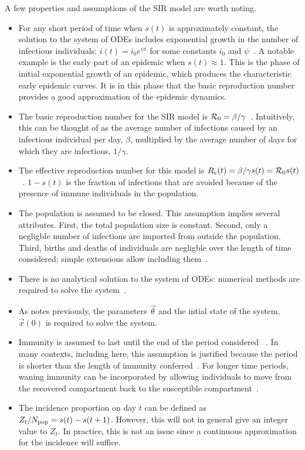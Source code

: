 \documentclass[thesis.tex]{subfiles}
\begin{document}
A few properties and assumptions of the SIR model are worth noting.
\begin{itemize}
    \item For any short period of time when $s(t)$ is approximately constant, the solution to the system of ODEs includes exponential growth in the number of infectious individuals: $i(t) = i_0 e^{\psi t}$ for some constants $i_0$ and $\psi$~\autocite[section 1.2]{diekmannMathematical}.
    A notable example is the early part of an epidemic when $s(t) \approx 1$.
    This is the phase of initial exponential growth of an epidemic, which produces the characteristic early epidemic curves.
    It is in this phase that the basic reproduction number provides a good approximation of the epidemic dynamics.
    \item The basic reproduction number for the SIR model is $\mathcal{R}_{0} = \beta / \gamma$~\autocite[20]{keelingModeling}.
    Intuitively, this can be thought of as the average number of infections caused by an infectious individual per day, $\beta$, multiplied by the average number of days for which they are infectious, $1/\gamma$.
    \item The effective reproduction number for this model is $R_e(t) = \beta / \gamma s(t) = \mathcal{R}_{0} s(t)$~\autocite{pellisEstimation}.
    $1-s(t)$ is the fraction of infections that are avoided because of the presence of immune individuals in the population.
    \item The population is assumed to be closed.
    This assumption implies several attributes.
    First, the total population size is constant.
    Second, only a negligble number of infections are imported from outside the population.
    Third, births and deaths of individuals are negligble over the length of time considered; simple extensions allow including them~\autocites[26]{keelingModeling}[214]{kretzschmarMathematical}.
    \item There is no analytical solution to the system of ODEs: numerical methods are required to solve the system~\autocite[25]{keelingModeling}.
    \item As notes previously, the parameters $\vec{\theta}$ and the intial state of the system, $\vec{x}(0)$ is required to solve the system.
    \item Immunity is assumed to last until the end of the  period considered ~\autocite[61]{andersonInfectious}.
    In many contexts, including here, this assumption is justified because the period is shorter than the length of immunity conferred~\autocite{milneImmunity}.
    For longer time periods, waning immunity can be incorporated by allowing individuals to move from the recovered compartment back to the susceptible compartment~\autocite[40]{keelingModeling}.
    \item The incidence proportion on day $t$ can be defined as $Z_t / N_\text{pop} = s(t) - s(t+1)$. However, this will not in general give an integer value to $Z_t$. In practice, this is not an issue since a continuous approximation for the incidence will suffice.
\end{itemize}
\end{document}
